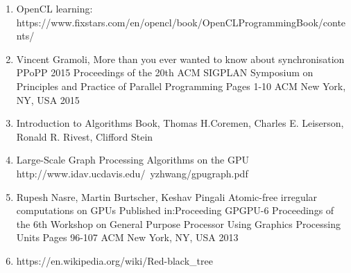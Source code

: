 \documentclass[BTech]{iitmdiss}
\begin{document}
\thebibliography

\begin{enumerate}  
\item OpenCL learning: \newblock\\
https://www.fixstars.com/en/opencl/book/OpenCLProgrammingBook/contents/
\item Vincent Gramoli, More than you ever wanted to know about synchronisation\\
PPoPP 2015 Proceedings of the 20th ACM SIGPLAN Symposium on Principles and Practice of Parallel Programming
Pages 1-10 
ACM New York, NY, USA 2015 
\item Introduction to Algorithms Book, Thomas H.Coremen, Charles E. Leiserson, Ronald R. Rivest, Clifford Stein
\item Large-Scale Graph Processing Algorithms on the GPU\\
http://www.idav.ucdavis.edu/~yzhwang/gpugraph.pdf
\item Rupesh Nasre, Martin Burtscher, Keshav Pingali Atomic-free irregular computations on GPUs
Published in:Proceeding
GPGPU-6 Proceedings of the 6th Workshop on General Purpose Processor Using Graphics Processing Units
Pages 96-107 
ACM New York, NY, USA 2013 
\item https://en.wikipedia.org/wiki/Red-black\_tree
\end{enumerate}

\appendix
\lstset{style=mystyle}
\end{document}
